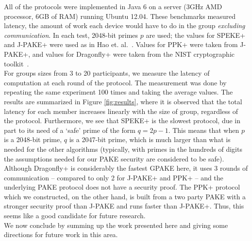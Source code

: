 All of the protocols were implemented in Java 6 on a server (3GHz AMD processor, 6GB of RAM) running Ubuntu 12.04. These
benchmarks measured latency, the amount of work each device would have to do in the group \emph{excluding communication}.
In each test, 2048-bit primes $p$ are used; the values for SPEKE+ and J-PAKE+ were used as in Hao et. al.~\cite{HaYiChSh15}.
Values for PPK+ were taken from J-PAKE+, and values for Dragonfly+ were taken from the NIST cryptographic toolkit~\cite{NIST}.
\\

For groups sizes from 3 to 20 participants, we measure the latency of computation at each round of the protocol. The measurement
was done by repeating the same experiment 100 times and taking the average values. The results are summarized in Figure \ref{fig:results}, 
where it is observed that the total latency for each member increases linearly with the size of group, regardless of the protocol.  Furthermore, we see that SPEKE+ is the slowest protocol, due in part to its need of a `safe' prime of the form $q = 2p-1$.  This means that when $p$ is a 2048-bit prime, $q$ is a 2047-bit prime, which is much larger than what is needed for the other algorithms (typically, with primes in the hundreds of digits the assumptions needed for our PAKE security are considered to be safe).  Although Dragonfly+ is considerably the fastest GPAKE here, it uses 3 rounds of communication -- compared to only 2 for J-PAKE+ and PPK+ -- and the underlying PAKE protocol does not have a security proof.  The PPK+ protocol which we constructed, on the other hand, is built from a two party PAKE with a stronger security proof than J-PAKE and runs faster than J-PAKE+.  Thus, this seems like a good candidate for future research.
\\

We now conclude by summing up the work presented here and giving some directions for future work in this area.

